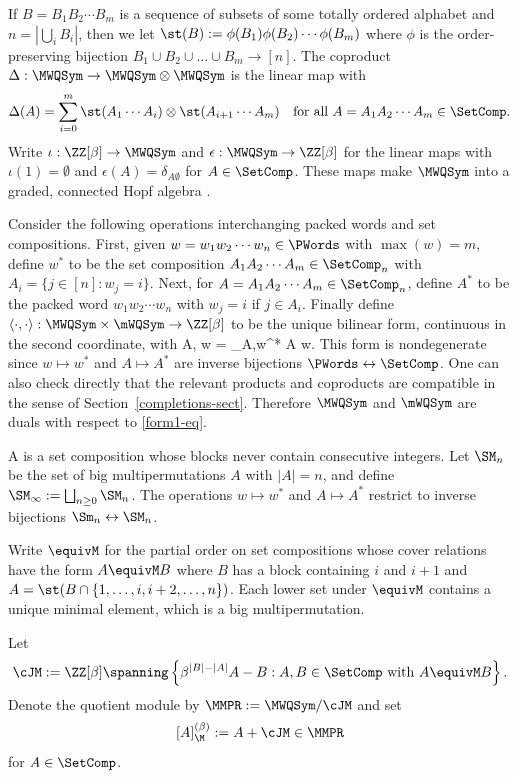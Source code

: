 If $B = B_1B_2\cdots B_m$ is a sequence of subsets of some totally ordered alphabet
and $n=|\bigcup_i B_i|$,
then we let $\st(B):=\phi(B_1) \phi(B_2)\cdots \phi(B_m)$
where $\phi$ is the   order-preserving bijection
$B_1 \cup B_2 \cup \dots \cup B_m \to [n]$.
%
The coproduct
$
\Delta : \MWQSym \to \MWQSym \otimes \MWQSym
$
is   the linear map with \[
\Delta(A) = \sum_{i=0}^m \st(A_1\cdots A_i) \otimes \st(A_{i+1}\cdots A_m)
\quad\text{for all $A=A_1A_2\cdots A_m \in \SetComp$.}\]
Write 
$\iota : \ZZ[\beta] \to \MWQSym$
and
$\epsilon : \MWQSym\to \ZZ[\beta]$
for the linear maps with
$\iota(1) =  \emptyset$
and
$\epsilon(A) = \delta_{A\emptyset}$ for $A \in \SetComp$.
These maps make  $\MWQSym$ into a graded, connected Hopf algebra \cite[\S2.1]{NovelliThibon}.

Consider the following operations interchanging packed words and set compositions.
First, given $w=w_1w_2\cdots w_n \in \PWords$ with $\max(w)=m$,
define $w^*$ to be the set composition $A_1A_2\cdots A_m \in \SetComp_n$
with $A_i = \{ j \in [n] : w_j = i\}$.
Next, for $A =A_1A_2\cdots A_m \in \SetComp_n$, define $A^*$
to be the packed word $w_1w_2\cdots w_n$ with $w_j = i$ if $j \in A_i$.
Finally define $\langle\cdot,\cdot\rangle : \MWQSym \times \mWQSym \to \ZZ[\beta]$ to be the unique bilinear
form,
continuous in the second coordinate, with
\be\label{form1-eq}
\langle A, w \rangle = \delta_{A,w^*}
\qquad{}A \in \SetComp{} w\in \PWords.
\ee
 This form is nondegenerate since  $w\mapsto w^*$ and $A \mapsto A^*$
are inverse bijections
$ \PWords \leftrightarrow \SetComp$.
One can also check directly that the relevant products and coproducts
 are compatible 
 in the sense of Section~\ref{completions-sect}.
Therefore $\MWQSym$ and $\mWQSym$ are duals
with respect to \eqref{form1-eq}.


 A  is a set composition whose blocks never contain
 consecutive integers. 
Let $\SM_n$ be the set of big multipermutations $A$
with $|A| = n$,
and define $\SM_\infty :=\bigsqcup_{n\geq 0} \SM_n$.
The operations $w\mapsto w^*$ and $A \mapsto A^*$
restrict to inverse bijections
$ \Sm_n \leftrightarrow \SM_n$. 

Write $\equivM$ for the partial order 
on set compositions whose cover relations have the form $A \equivM B$ where 
$B$ has a block containing $i$ and $i+1$
and $A = \st(B \cap \{1,\dots,i,i+2,\dots,n\})$.
Each lower set under $\equivM$ contains a unique minimal element, which is a big multipermutation.

\begin{definition}
Let \[
\cJM:=\ZZ[\beta]\spanning\left\{\beta^{|B|-|A|} A- B : A,B\in \SetComp\text{ with }A \equivM B\right\}.\]
Denote the quotient module by $\MMPR:=\MWQSym / \cJM$
and set
\[[A]^{(\beta)}_\M := A + \cJM \in \MMPR\]
for $A \in \SetComp$.
\end{definition}

